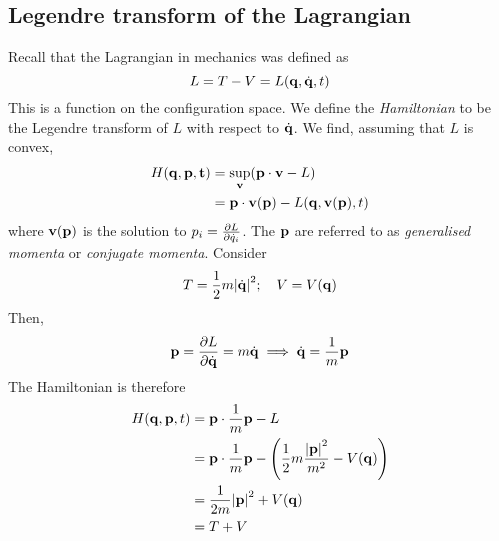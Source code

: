 \subsection{Legendre transform of the Lagrangian}
Recall that the Lagrangian in mechanics was defined as
\[
	L = T - V = L(\vb q, \dot{\vb q}, t)
\]
This is a function on the configuration space.
We define the \textit{Hamiltonian} to be the Legendre transform of \( L \) with respect to \( \dot{\vb q} \).
We find, assuming that \( L \) is convex,
\begin{align*}
	H(\vb q, \vb p, \vb t) & = \sup_{\vb v} (\vb p \cdot \vb v - L)                 \\
	                       & = \vb p \cdot \vb v(\vb p) - L(\vb q, \vb v(\vb p), t)
\end{align*}
where \( \vb v(\vb p) \) is the solution to \( p_i = \pdv{L}{\dot{q}_i} \).
The \( \vb p \) are referred to as \textit{generalised momenta} or \textit{conjugate momenta}.
Consider
\[
	T = \frac{1}{2}m \abs{\dot{\vb q}}^2;\quad V = V(\vb q)
\]
Then,
\[
	\vb p = \pdv{L}{\dot{\vb q}} = m \dot{\vb q} \implies \dot{\vb q} = \frac{1}{m} \vb p
\]
The Hamiltonian is therefore
\begin{align*}
	H(\vb q, \vb p, t) & = \vb p \cdot \frac{1}{m} \vb p - L                                                       \\
	                   & = \vb p \cdot \frac{1}{m} \vb p - \qty(\frac{1}{2}m \frac{\abs{\vb p}^2}{m^2} - V(\vb q)) \\
	                   & = \frac{1}{2m} \abs{\vb p}^2 + V(\vb q)                                                   \\
	                   & = T + V
\end{align*}

